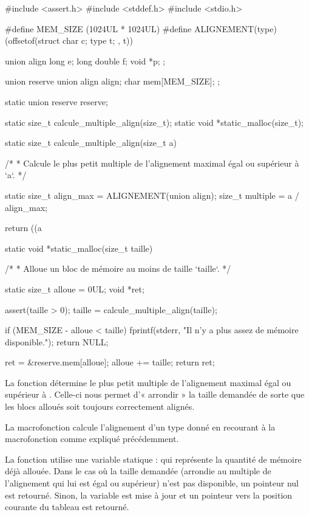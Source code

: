 \begin{C}
#include <assert.h>
#include <stddef.h>
#include <stdio.h>

#define MEM_SIZE (1024UL * 1024UL)
#define ALIGNEMENT(type) (offsetof(struct { char c; type t; }, t))

union align
{
    long e;
    long double f;
    void *p;
};

union reserve
{
    union align align;
    char mem[MEM_SIZE];
};

static union reserve reserve;

static size_t calcule_multiple_align(size_t);
static void *static_malloc(size_t);


static size_t calcule_multiple_align(size_t a)
{
    /*
     * Calcule le plus petit multiple de l'alignement maximal égal ou supérieur à `a`.
     */

    static size_t align_max = ALIGNEMENT(union align);
    size_t multiple = a / align_max;

    return ((a %
}


static void *static_malloc(size_t taille)
{
    /*
     * Alloue un bloc de mémoire au moins de taille `taille`.
     */

    static size_t alloue = 0UL;
    void *ret;

    assert(taille > 0);
    taille = calcule_multiple_align(taille);

    if (MEM_SIZE - alloue < taille)
    {
        fprintf(stderr, "Il n'y a plus assez de mémoire disponible.\n");
        return NULL;
    }

    ret = &reserve.mem[alloue];
    alloue += taille;
    return ret;
}
\end{C}

La fonction  détermine le plus petit
multiple de l'alignement maximal égal ou supérieur à .
Celle-ci nous permet d'« arrondir » la taille demandée de sorte que les
blocs alloués soit toujours correctement alignés.

La macrofonction  calcule l'alignement d'un type
donné en recourant à la macrofonction  comme expliqué
précédemment.

La fonction  utilise une variable statique :
 qui représente la quantité de mémoire déjà allouée. Dans
le cas où la taille demandée (arrondie au multiple de l'alignement qui
lui est égal ou supérieur) n'est pas disponible, un pointeur nul est
retourné. Sinon, la variable  est mise à jour et un
pointeur vers la position courante du tableau  est
retourné.

